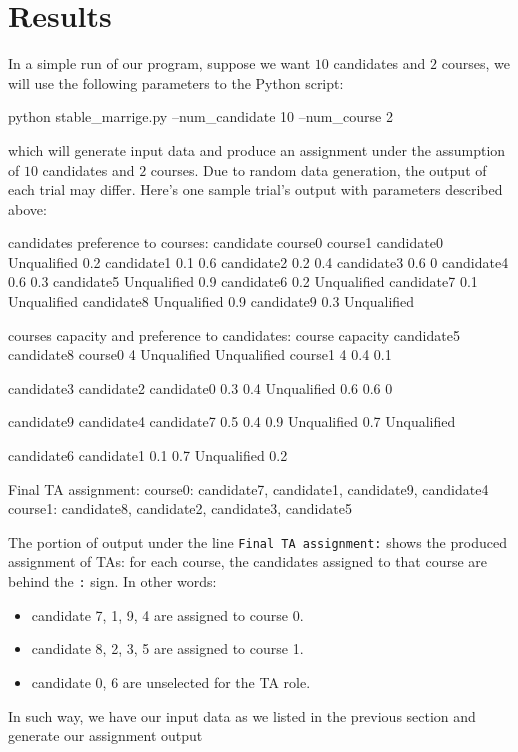 \documentclass[twoside,twocolumn]{article}
\begin{document}
    \section{Results}
    In a simple run of our program, suppose we want $10$ candidates and $2$ courses, we will use the following parameters to
    the Python script:
\begin{spverbatim}
    python stable_marrige.py --num_candidate 10 --num_course 2
\end{spverbatim}
    which will generate input data and produce an assignment under the assumption of $10$ candidates and $2$ courses. Due to
    random data generation, the output of each trial may differ. Here's one sample trial's output with parameters described above:
\begin{spverbatim}
candidates preference to courses:
candidate      course0      course1
candidate0  Unqualified          0.2
candidate1          0.1          0.6
candidate2          0.2          0.4
candidate3          0.6            0
candidate4          0.6          0.3
candidate5  Unqualified          0.9
candidate6          0.2  Unqualified
candidate7          0.1  Unqualified
candidate8  Unqualified          0.9
candidate9          0.3  Unqualified

courses capacity and preference to candidates:
course capacity   candidate5   candidate8   
course0        4  Unqualified  Unqualified         
course1        4          0.4          0.1         

candidate3  candidate2  candidate0 
       0.3         0.4  Unqualified
       0.6         0.6           0 

candidate9  candidate4   candidate7   
        0.5        0.4         0.9 
Unqualified        0.7  Unqualified 

candidate6  candidate1
0.1                0.7
Unqualified        0.2

Final TA assignment:
course0: candidate7, candidate1, candidate9, candidate4
course1: candidate8, candidate2, candidate3, candidate5
\end{spverbatim}
    The portion of output under the line \verb|Final TA assignment:| shows the produced assignment of TAs: for each course,
    the candidates assigned to that course are behind the \verb|:| sign. In other words:
    \begin{itemize}
        \item candidate 7, 1, 9, 4 are assigned to course 0.
        \item candidate 8, 2, 3, 5 are assigned to course 1.
        \item candidate 0, 6 are unselected for the TA role.
    \end{itemize}
    In such way, we have our input data as we listed in the previous section and generate our assignment output
\end{document}
